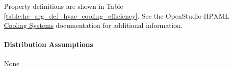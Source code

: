 

Property definitions are shown in Table \ref{table:hc_arg_def_hvac_cooling_efficiency}. See the OpenStudio-HPXML \href{https://openstudio-hpxml.readthedocs.io/en/v1.10.0/workflow_inputs.html#hpxml-cooling-systems}{Cooling Systems} documentation for additional information.



\paragraph{Distribution Assumptions}
% 
None
